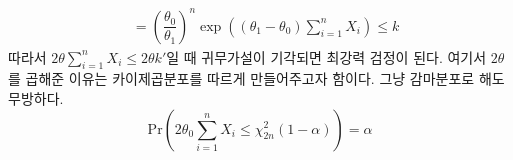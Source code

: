 \documentclass[answers]{exam}
\begin{document}
\begin{questions}
\begin{solution}
\begin{enumerate}[(a)]
\begin{align}
    			&=\left(\dfrac{\theta_{0}}{\theta_{1}}\right)^{n}\exp\left(\left(\theta_{1}-\theta_{0}\right)\sum_{i=1}^{n}X_{i}\right) \leq k
    		\end{align}
    		따라서 $2\theta\sum_{i=1}^{n}X_{i}\leq 2\theta k'$일 때 귀무가설이 기각되면 최강력 검정이 된다. 여기서 $2\theta$를 곱해준 이유는 카이제곱분포를 따르게 만들어주고자 함이다. 그냥 감마분포로 해도 무방하다.
    		\begin{equation}
    			\mathrm{Pr}\left(2\theta_{0}\sum_{i=1}^{n}X_{i}\leq \chi_{2n}^{2}\left(1-\alpha\right)\right)=\alpha
    		\end{equation}
    	\end{enumerate}
    \end{solution}
\end{questions}
\end{document}
